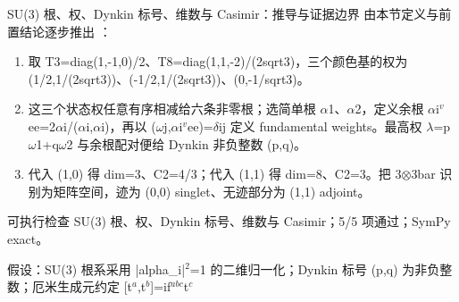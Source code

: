 \begin{frame}[t]{SU(3) 根、权、Dynkin 标号、维数与 Casimir：推导与证据边界}
\footnotesize
{}\quad 由本节定义与前置结论逐步推出 ：
\begin{enumerate}
\item 取 T3=diag(1,-1,0)/\allowbreak{}2、T8=diag(1,1,-2)/\allowbreak{}(2sqrt3)，三个颜色基的权为 (1/\allowbreak{}2,1/\allowbreak{}(2sqrt3))、(-1/\allowbreak{}2,1/\allowbreak{}(2sqrt3))、(0,-1/\allowbreak{}sqrt3)。
\item 这三个状态权任意有序相减给六条非零根；选简单根 \ensuremath{\alpha}1、\ensuremath{\alpha}2，定义余根 \ensuremath{\alpha}i\ensuremath{^{v}}ee=2\ensuremath{\alpha}i/\allowbreak{}(\ensuremath{\alpha}i,\ensuremath{\alpha}i)，再以 (\ensuremath{\omega}j,\ensuremath{\alpha}i\ensuremath{^{v}}ee)=\ensuremath{\delta}ij 定义 fundamental weights。最高权 \ensuremath{\lambda}=p\ensuremath{\omega}1+q\ensuremath{\omega}2 与余根配对便给 Dynkin 非负整数 (p,q)。
\item 代入 (1,0) 得 dim=3、C2=4/\allowbreak{}3；代入 (1,1) 得 dim=8、C2=3。把 3\ensuremath{\otimes}3bar 识别为矩阵空间，迹为 (0,0) singlet、无迹部分为 (1,1) adjoint。
\end{enumerate}\begin{block}{可执行检查}
\quad SU(3) 根、权、Dynkin 标号、维数与 Casimir；5/5 项通过；SymPy exact。
\par\scriptsize 假设：SU(3) 根系采用 |alpha\_i|\ensuremath{^{2}}=1 的二维归一化；Dynkin 标号 (p,q) 为非负整数；厄米生成元约定 [t\ensuremath{^{a}},t\ensuremath{^{b}}]=if\ensuremath{^{abc}}t\ensuremath{^{c}}
\end{block}
\end{frame}

